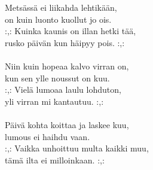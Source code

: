 
Metsässä ei liikahda lehtikään, \\ on kuin luonto kuollut jo ois. \\ :,: Kuinka kaunis on illan hetki tää, \\ rusko päivän kun häipyy pois. :,: \\ \hspace{10mm} \\ Niin kuin hopeaa kalvo virran on, \\ kun sen ylle noussut on kuu. \\ :,: Vielä lumoaa laulu lohduton, \\ yli virran mi kantautuu. :,: \\ \hspace{10mm} \\ Päivä kohta koittaa ja laskee kuu, \\ lumous ei haihdu vaan. \\ :,: Vaikka unhoittuu multa kaikki muu, \\ tämä ilta ei milloinkaan. :,: